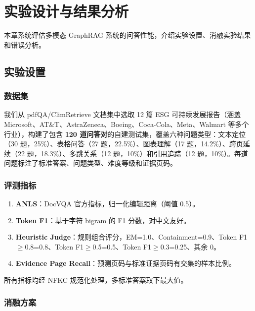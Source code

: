 
\chapter{实验设计与结果分析}\label{ch:experiments}

本章系统评估多模态 GraphRAG 系统的问答性能，介绍实验设置、消融实验结果和错误分析。

\section{实验设置}\label{sec:exp-setup}

\subsection{数据集}

我们从 pdfQA/ClimRetrieve 文档集中选取 12 篇 ESG 可持续发展报告（涵盖 Microsoft、AT\&T、AstraZeneca、Boeing、Coca-Cola、Meta、Walmart 等多个行业），构建了包含 \textbf{120 道问答对}的自建测试集，覆盖六种问题类型：文本定位（30 题，25\%）、表格问答（27 题，22.5\%）、图表理解（17 题，14.2\%）、跨页延续（22 题，18.3\%）、多跳关系（12 题，10\%）和引用追踪（12 题，10\%）。每道问题标注了标准答案、问题类型、难度等级和证据页码。

\subsection{评测指标}

\begin{enumerate}[label=（\arabic*）]
\item \textbf{ANLS}：DocVQA 官方指标，归一化编辑距离（阈值 0.5）。
\item \textbf{Token F1}：基于字符 bigram 的 F1 分数，对中文友好。
\item \textbf{Heuristic Judge}：规则组合评分，EM=1.0、Containment=0.9、Token F1$\ge$0.8=0.8、Token F1$\ge$0.5=0.5、Token F1$\ge$0.3=0.25、其余 0。
\item \textbf{Evidence Page Recall}：预测页码与标准证据页码有交集的样本比例。
\end{enumerate}

所有指标均经 NFKC 规范化处理，多标准答案取下最大值。

\subsection{消融方案}

